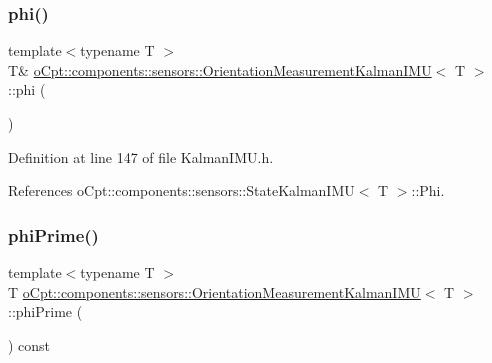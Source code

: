 \subsubsection{\texorpdfstring{phi()}{phi()}\hspace{0.1cm}{\footnotesize\ttfamily [2/2]}}
{\footnotesize\ttfamily template$<$typename T $>$ \\
T\& \hyperlink{classo_cpt_1_1components_1_1sensors_1_1_orientation_measurement_kalman_i_m_u}{o\+Cpt\+::components\+::sensors\+::\+Orientation\+Measurement\+Kalman\+I\+MU}$<$ T $>$\+::phi (\begin{DoxyParamCaption}{ }\end{DoxyParamCaption})\hspace{0.3cm}{\ttfamily [inline]}}



Definition at line 147 of file Kalman\+I\+M\+U.\+h.



References o\+Cpt\+::components\+::sensors\+::\+State\+Kalman\+I\+M\+U$<$ T $>$\+::\+Phi.

\hypertarget{classo_cpt_1_1components_1_1sensors_1_1_orientation_measurement_kalman_i_m_u_a0b5849704f6c173ed41787f9b28a57c9}{}\label{classo_cpt_1_1components_1_1sensors_1_1_orientation_measurement_kalman_i_m_u_a0b5849704f6c173ed41787f9b28a57c9} 
\subsubsection{\texorpdfstring{phi\+Prime()}{phiPrime()}\hspace{0.1cm}{\footnotesize\ttfamily [1/2]}}
{\footnotesize\ttfamily template$<$typename T $>$ \\
T \hyperlink{classo_cpt_1_1components_1_1sensors_1_1_orientation_measurement_kalman_i_m_u}{o\+Cpt\+::components\+::sensors\+::\+Orientation\+Measurement\+Kalman\+I\+MU}$<$ T $>$\+::phi\+Prime (\begin{DoxyParamCaption}{ }\end{DoxyParamCaption}) const\hspace{0.3cm}{\ttfamily [inline]}}



